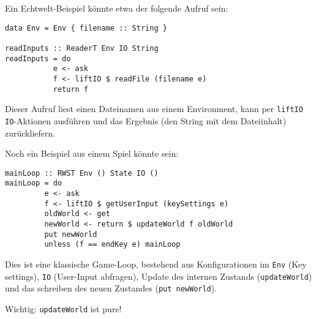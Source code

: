 \documentclass{beamer}
\begin{document}
\begin{frame}[fragile]
Ein Echtwelt-Beispiel könnte etwa der folgende Aufruf sein:\bigskip

\begin{verbatim}
data Env = Env { filename :: String }

readInputs :: ReaderT Env IO String
readInputs = do
           e <- ask
           f <- liftIO $ readFile (filename e)
           return f
\end{verbatim}
\pause
Dieser Aufruf liest einen Dateinamen aus einem Environment, kann per \texttt{liftIO} \texttt{IO}-Aktionen ausführen und das Ergebnis (den String mit dem Dateiinhalt) zurückliefern.
\end{frame}

\begin{frame}[fragile]
Noch ein Beispiel aus einem Spiel könnte sein:\smallskip

\begin{verbatim}
mainLoop :: RWST Env () State IO ()
mainLoop = do
         e <- ask
         f <- liftIO $ getUserInput (keySettings e)
         oldWorld <- get
         newWorld <- return $ updateWorld f oldWorld
         put newWorld
         unless (f == endKey e) mainLoop
\end{verbatim}
\bigskip

\pause
Dies ist eine klassische Game-Loop, bestehend aus Konfigurationen im \texttt{Env} (Key settings), \texttt{IO} (User-Input abfragen), Update des internen Zustands (\texttt{updateWorld}) und das schreiben des neuen Zustandes (\texttt{put newWorld}).\smallskip

\pause
Wichtig: \texttt{updateWorld} ist pure!
\end{frame}
\end{document}
